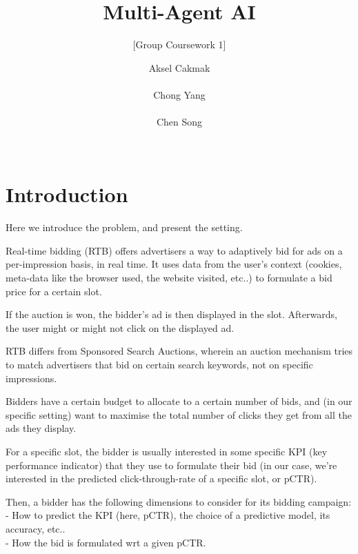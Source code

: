 \documentclass{sig-alternate-05-2015}
\begin{document}

\title{Multi-Agent AI}
\subtitle{[Group Coursework 1]}

\author{
\alignauthor
Aksel Cakmak\\
       \\
\alignauthor
Chong Yang\\
       \\
\alignauthor
Chen Song \\
       \\
}

\maketitle

\section{Introduction}

Here we introduce the problem, and present the setting.

Real-time bidding (RTB) offers advertisers a way to adaptively bid for ads on a per-impression basis, in real time.
It uses data from the user's context (cookies, meta-data like the browser used, the website visited, etc..) to formulate a bid price for a certain slot.

If the auction is won, the bidder's ad is then displayed in the slot. Afterwards, the user might or might not click on the displayed ad.

RTB differs from Sponsored Search Auctions, wherein an auction mechanism tries to match advertisers that bid on certain search keywords, not on specific impressions.

Bidders have a certain budget to allocate to a certain number of bids, and (in our specific setting) want to maximise the total number of clicks they get from all the ads they display.

For a specific slot, the bidder is usually interested in some specific KPI (key performance indicator) that they use to formulate their bid (in our case, we're interested in the predicted click-through-rate of a specific slot, or pCTR).

Then, a bidder has the following dimensions to consider for its bidding campaign: \\
- How to predict the KPI (here, pCTR), the choice of a predictive model, its accuracy, etc.. \\
- How the bid is formulated wrt a given pCTR. \\
\end{document}
